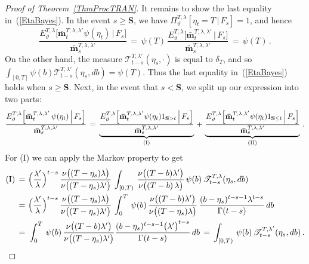 \documentclass[10pt]{article}
\numberwithin{equation}{section}
\theoremstyle{definition}
\begin{document}
\begin{proof}[Proof of Theorem~\ref{ThmProcTRAN}]
It remains to show the last equality in~(\ref{EtaBayes}).  In the event $s\geq \mathbf{S} $, we have $\Pi^{T,\lambda}_{\vartheta}[\eta_t=T\,|\, F_s] =1   $, and hence
$$   \frac{ E^{T,\lambda }_{\vartheta}\Big[  \mathbf{\bar{m}}_{t}^{T,\lambda,\lambda'}\psi(\eta_t)\,\Big|\, F_s \Big]  }{ \mathbf{\bar{m}}_{s}^{T,\lambda,\lambda'} }\,=\, \psi(T) \,\frac{ E^{T,\lambda }_{\vartheta}\Big[  \mathbf{\bar{m}}_{t}^{T,\lambda,\lambda'}\,\Big|\, F_s \Big]  }{ \mathbf{\bar{m}}_{s}^{T,\lambda,\lambda'} }\,=\, \psi(T) \,.  $$
On the other hand, the measure $ \mathscr{T}^{T,\lambda'}_{t-s}(\eta_s,\cdot)$ is equal to $\delta_T$, and so $\int_{[0,T]}\psi(b)   \mathscr{T}^{T,\lambda'}_{t-s}(\eta_s,db)=\psi(T)$. Thus the last equality in~(\ref{EtaBayes}) holds  when $s \geq \mathbf{S}$.  Next, in the event that $s <\mathbf{S} $, we split up our expression into two parts:
\begin{align*}
 \frac{E^{T,\lambda }_{\vartheta}\Big[\mathbf{\bar{m}}_{t}^{T,\lambda,\lambda'}\,\psi(\eta_t)\,\Big|\, F_s \Big] }{\mathbf{\bar{m}}_{s}^{T,\lambda,\lambda'}}  \,=\,\underbrace{\frac{E^{T,\lambda }_{\vartheta}\Big[\mathbf{\bar{m}}_{t}^{T,\lambda,\lambda'}\psi(\eta_t)1_{\mathbf{S} > t} \, \Big|\, F_s \Big]}{ \mathbf{\bar{m}}_{s}^{T,\lambda,\lambda'} }}_{\textup{(I)}} \,+\,\underbrace{\frac{E^{T,\lambda }_{\vartheta}\Big[\mathbf{\bar{m}}_{t}^{T,\lambda,\lambda'}\psi(\eta_t) 1_{\mathbf{S}\leq t} \,\Big|\, F_s \Big]}{ \mathbf{\bar{m}}_{s}^{T,\lambda,\lambda'} }}_{\textup{(II)}} \,.\nonumber 
\end{align*}
For (I) we can apply the Markov property to get
\begin{align}\label{EtaBayes1}
 \textup{(I)} \,=\,&\,\Big(\frac{\lambda'}{\lambda}\Big)^{t-s }\,\frac{ \nu\big( (T-\eta_s) \lambda   \big) }{ \nu\big((T-\eta_s) \lambda'   \big)  } \,\int_{[0,T)}\, \frac{ \nu\big( (T-b)  \lambda'  \big) }{ \nu\big( (T-b)\,\lambda      \big)  } \,\psi(b) \,\mathscr{T}_{t-s}^{T,\lambda}(\eta_s, db) \nonumber  \\
\,=\,&\, \Big(\frac{\lambda'}{\lambda}\Big)^{t-s }\,\frac{ \nu\big( (T-\eta_s) \lambda   \big) }{ \nu\big((T-\eta_s)\lambda'    \big)  }  \,\int_{0}^T\, \psi(b) \,\frac{ \nu\big((T-b) \lambda'\big)}{ \nu\big((T-\eta_s)\lambda \big)}\,\frac{(b-\eta_s)^{t-s-1} \lambda^{t-s}  }{ \Gamma(t-s) } \,db\nonumber  \\
  \,=\,&\,    \int_{0}^T\,  \psi(b)\, \frac{ \nu\big( (T-b) \lambda'   \big) }{ \nu\big((T-\eta_s)\lambda' \big)  } \frac{(b-\eta_s)^{t-s-1} \big(\lambda'\big)^{t-s}  }{ \Gamma(t-s) } \, db  \,=\,\int_{[0,T)}\,\psi(b)  \, \mathscr{T}^{T,\lambda'}_{t-s}(\eta_s,db)\,.

\end{align}
\end{proof}
\end{document}
